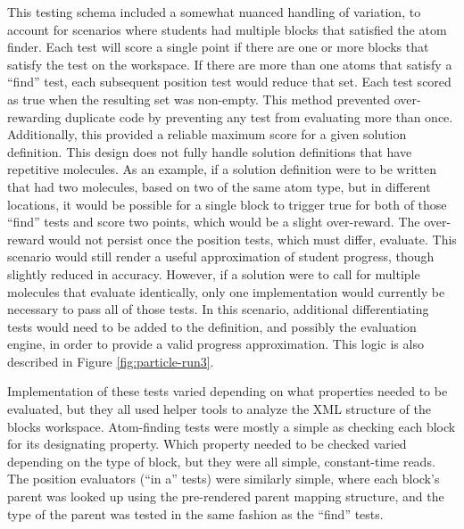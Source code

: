This testing schema included a somewhat nuanced handling of variation, to account for scenarios where students had multiple blocks that satisfied the atom finder. Each test will score a single point if there are one or more blocks that satisfy the test on the workspace. If there are more than one atoms that satisfy a ``find'' test, each subsequent position test would reduce that set. Each test scored as true when the resulting set was non-empty. This method prevented over-rewarding duplicate code by preventing any test from evaluating more than once. Additionally, this provided a reliable maximum score for a given solution definition. This design does not fully handle solution definitions that have repetitive molecules. As an example, if a solution definition were to be written that had two molecules, based on two of the same atom type, but in different locations, it would be possible for a single block to trigger true for both of those ``find'' tests and score two points, which would be a slight over-reward. The over-reward would not persist once the position tests, which must differ, evaluate. This scenario would still render a useful approximation of student progress, though slightly reduced in accuracy. However, if a solution were to call for multiple molecules that evaluate identically, only one implementation would currently be necessary to pass all of those tests. In this scenario, additional differentiating tests would need to be added to the definition, and possibly the evaluation engine, in order to provide a valid progress approximation. 
This logic is also described in Figure \ref{fig:particle-run3}. 

Implementation of these tests varied depending on what properties needed to be evaluated, but they all used helper tools to analyze the XML structure of the blocks workspace. Atom-finding tests were mostly a simple as checking each block for its designating property. Which property needed to be checked varied depending on the type of block, but they were all simple, constant-time reads. The position evaluators (``in a'' tests) were similarly simple, where each block's parent was looked up using the pre-rendered parent mapping structure, and the type of the parent was tested in the same fashion as the ``find'' tests. 

